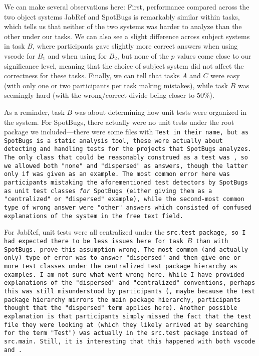 \documentclass[../thesis]{subfiles}
\begin{document}
We can make several observations here:
First, performance compared across the two object systems JabRef and SpotBugs is remarkably similar within tasks, which tells us that neither of the two systems was harder to analyze than the other under our tasks.
We can also see a slight difference across subject systems in task $B$, where participants gave slightly more correct answers when using \gls{vscode} for $B_1$ and when using \SEE{} for $B_2$, but none of the $p$ values come close to our significance level, meaning that the choice of subject system did not affect the correctness for these tasks.
Finally, we can tell that tasks $A$ and $C$ were easy (with only one or two participants per task making mistakes), while task $B$ was seemingly hard (with the wrong/correct divide being closer to 50\%).

As a reminder, task $B$ was about determining how unit tests were organized in the system.
For SpotBugs, there actually were no unit tests under the root package we included---there were some files with \tt{Test} in their name, but as SpotBugs is a static analysis tool, these were actually about detecting and handling tests for the projects that SpotBugs analyzes.
The only class that could be reasonably construed as a test was , so we allowed both "none" and "dispersed" as answers, though the latter only if  was given as an example.
The most common error here was participants mistaking the aforementioned test detectors by SpotBugs as unit test classes \emph{for} SpotBugs (either giving them as a "centralized" or "dispersed" example), while the second-most common type of wrong answer were "other" answers which consisted of confused explanations of the system in the free text field.

For JabRef, unit tests were all centralized under the \tt{src.test} package, so I had expected there to be less issues here for task $B$ than with SpotBugs.
 prove this assumption wrong.
The most common (and actually only) type of error was to answer "dispersed" and then give one or more test classes under the centralized test package hierarchy as examples.
I am not sure what went wrong here.
While I have provided explanations of the "dispersed" and "centralized" conventions, perhaps this was still misunderstood by participants (\eg, maybe because the test package hierarchy mirrors the main package hierarchy, participants thought that the "dispersed" term applies here).
Another possible explanation is that participants simply missed the fact that the test file they were looking at (which they likely arrived at by searching for the term "Test") was actually in the \tt{src.test} package instead of \tt{src.main}.
Still, it is interesting that this happened with both \gls{vscode} and \SEE{}.
\end{document}

